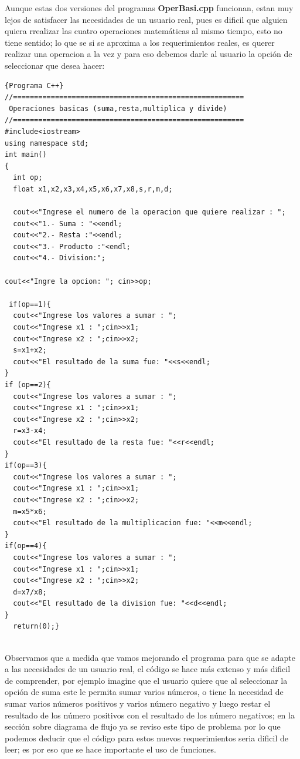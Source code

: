 \documentclass[a4paper,12pt,spanish]{article}
\newcommand\mylstcaption{}
\begin{document}
    



    Aunque estas dos versiones del programas \textbf{OperBasi.cpp} funcionan,  estan muy lejos de satisfacer las necesidades de un usuario real, pues es dificil que alguien quiera rrealizar las cuatro operaciones matemáticas al mismo tiempo, esto no tiene sentido; lo que se si se aproxima a los requerimientos reales, es querer realizar una operacion a la vez y para eso debemos darle al usuario la opción de seleccionar que desea hacer:

\renewcommand\mylstcaption{\textbf{operbasi3.cpp}: Operaciones Básicas}

\begin{lstlisting}[frame=trBL,firstnumber=1,caption=\mylstcaption]{Programa C++}
//=======================================================
 Operaciones basicas (suma,resta,multiplica y divide)
//=======================================================
#include<iostream>
using namespace std;
int main()
{
  int op;
  float x1,x2,x3,x4,x5,x6,x7,x8,s,r,m,d;
  
  cout<<"Ingrese el numero de la operacion que quiere realizar : ";
  cout<<"1.- Suma : "<<endl;
  cout<<"2.- Resta :"<<endl;
  cout<<"3.- Producto :"<endl;
  cout<<"4.- Division:";

cout<<"Ingre la opcion: "; cin>>op;

 if(op==1){
  cout<<"Ingrese los valores a sumar : ";
  cout<<"Ingrese x1 : ";cin>>x1;
  cout<<"Ingrese x2 : ";cin>>x2;
  s=x1+x2;
  cout<<"El resultado de la suma fue: "<<s<<endl;
}
if (op==2){
  cout<<"Ingrese los valores a sumar : ";
  cout<<"Ingrese x1 : ";cin>>x1;
  cout<<"Ingrese x2 : ";cin>>x2;
  r=x3-x4;
  cout<<"El resultado de la resta fue: "<<r<<endl;
}
if(op==3){
  cout<<"Ingrese los valores a sumar : ";
  cout<<"Ingrese x1 : ";cin>>x1;
  cout<<"Ingrese x2 : ";cin>>x2;
  m=x5*x6;
  cout<<"El resultado de la multiplicacion fue: "<<m<<endl;
}
if(op==4){
  cout<<"Ingrese los valores a sumar : ";
  cout<<"Ingrese x1 : ";cin>>x1;
  cout<<"Ingrese x2 : ";cin>>x2;
  d=x7/x8;
  cout<<"El resultado de la division fue: "<<d<<endl;
}
  return(0);}
  
\end{lstlisting}



    Observamos que a medida que vamos mejorando el programa para que se adapte a las necesidades de un usuario real, el código se hace más extenso y más dificil de comprender, por ejemplo imagine que el usuario quiere que al seleccionar la opción de suma este le permita sumar varios números, o tiene la necesidad de sumar varios números positivos y varios número negativo y luego restar el resultado de los número positivos con el resultado de los número negativos; en la sección sobre diagrama de flujo ya se reviso este tipo de problema por lo que podemos deducir que el código para estos nuevos requerimientos seria dificil de leer; es por eso que se hace importante el uso de funciones.
\end{document}
